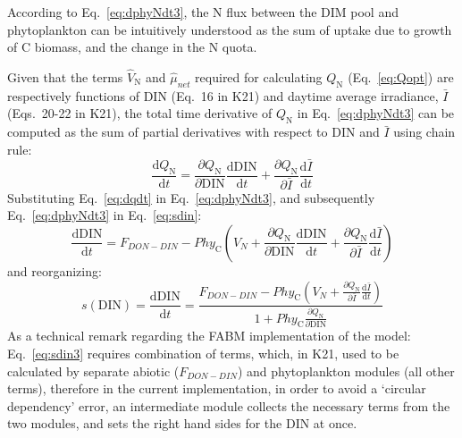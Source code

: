 \documentclass[gmd, manuscript, draft]{copernicus}
\begin{document}
According to Eq.~\ref{eq:dphyNdt3}, the N flux between the DIM pool and phytoplankton can be intuitively understood as the sum of uptake due to growth of C biomass, and the change in the N quota. %

Given that the terms $\hat{V}_\text{N}$ and $\hat{\mu}_{net}$ required for calculating $Q_\text{N}$ (Eq.~\ref{eq:Qopt}) are respectively functions of DIN (Eq.~16 in K21) and daytime average irradiance, $\bar{I}$ (Eqs.~20-22 in K21), the total time derivative of $Q_\text{N}$ in Eq.~\ref{eq:dphyNdt3} can be computed as the sum of partial derivatives with respect to DIN and $\bar{I}$ using chain rule: 
\begin{equation} \label{eq:dqdt}
 \frac{\text{d} Q_\text{N}}{\text{d} t} = \frac{\partial Q_\text{N}}{\partial \text{DIN}} \frac{\text{d} \text{DIN}}{\text{d} t} +  \frac{\partial Q_\text{N}}{\partial \bar{I}} \frac{\text{d} \bar{I}}{\text{d} t} 
\end{equation}
Substituting Eq.~\ref{eq:dqdt} in Eq.~\ref{eq:dphyNdt3}, and subsequently Eq.~\ref{eq:dphyNdt3} in Eq.~\ref{eq:sdin}:
\begin{equation}\label{eq:sdin2}
 \frac{\text{d}\text{DIN}}{\text{d}t} = F_{DON-DIN} - Phy_{\text{C}} \left(V_N + \frac{\partial Q_\text{N}}{\partial \text{DIN}} \frac{\text{d} \text{DIN}}{\text{d} t} +  \frac{\partial Q_\text{N}}{\partial \bar{I}} \frac{\text{d} \bar{I}}{\text{d} t} \right)
\end{equation}
and reorganizing:
\begin{equation}\label{eq:sdin3}
 s(\text{DIN}) = \frac{\text{d}\text{DIN}}{\text{d}t} = \frac{F_{DON-DIN} - Phy_{\text{C}} \left(V_N +  \frac{\partial Q_\text{N}}{\partial \bar{I}} \frac{\text{d} \bar{I}}{\text{d} t} \right)}{ 1+Phy_{\text{C}}\frac{\partial Q_\text{N}}{\partial \text{DIN}}}
\end{equation}
As a technical remark regarding the FABM implementation of the model: Eq.~\ref{eq:sdin3} requires combination of terms, which, in K21, used to be calculated by separate abiotic ($F_{DON-DIN}$) and phytoplankton modules (all other terms), therefore in the current implementation, in order to avoid a `circular dependency' error, an intermediate module collects the necessary terms from the two modules, and sets the right hand sides for the DIN at once.
\end{document}
